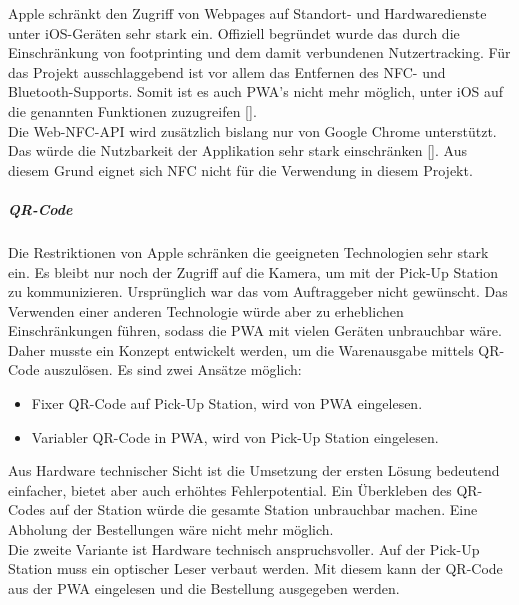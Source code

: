Apple schränkt den Zugriff von Webpages auf Standort- und Hardwaredienste unter iOS-Geräten sehr stark ein. Offiziell begründet wurde das durch die Einschränkung von footprinting und dem damit verbundenen Nutzertracking. Für das Projekt ausschlaggebend ist vor allem das Entfernen des NFC- und Bluetooth-Supports. Somit ist es auch \gls{PWA}'s nicht mehr möglich, unter iOS auf die genannten Funktionen zuzugreifen [\cite{webKitTracking}].\\
Die Web-NFC-API wird zusätzlich bislang nur von Google Chrome unterstützt. Das würde die Nutzbarkeit der Applikation sehr stark einschränken [\cite{kompWebNFC}]. 
Aus diesem Grund eignet sich \ac{NFC} nicht für die Verwendung in diesem Projekt. 
\subparagraph{QR-Code}\label{qrcode}
Die Restriktionen von Apple schränken die geeigneten Technologien sehr stark ein. Es bleibt nur noch der Zugriff auf die Kamera, um mit der Pick-Up Station zu kommunizieren. Ursprünglich war das vom Auftraggeber nicht gewünscht. Das Verwenden einer anderen Technologie würde aber zu erheblichen Einschränkungen führen, sodass die \gls{PWA} mit vielen Geräten unbrauchbar wäre. \\
Daher musste ein Konzept entwickelt werden, um die Warenausgabe mittels QR-Code auszulösen. Es sind zwei Ansätze möglich: 
\begin{itemize}
	\item Fixer QR-Code auf Pick-Up Station, wird von \gls{PWA} eingelesen. 
	\item Variabler QR-Code in \gls{PWA}, wird von Pick-Up Station eingelesen. 
\end{itemize}
Aus Hardware technischer Sicht ist die Umsetzung der ersten Lösung bedeutend einfacher, bietet aber auch erhöhtes Fehlerpotential. Ein Überkleben des QR-Codes auf der Station würde die gesamte Station unbrauchbar machen. Eine Abholung der Bestellungen wäre nicht mehr möglich. \\
Die zweite Variante ist Hardware technisch anspruchsvoller. Auf der Pick-Up Station muss ein optischer Leser verbaut werden. Mit diesem kann der QR-Code aus der \gls{PWA} eingelesen und die Bestellung ausgegeben werden. \\

